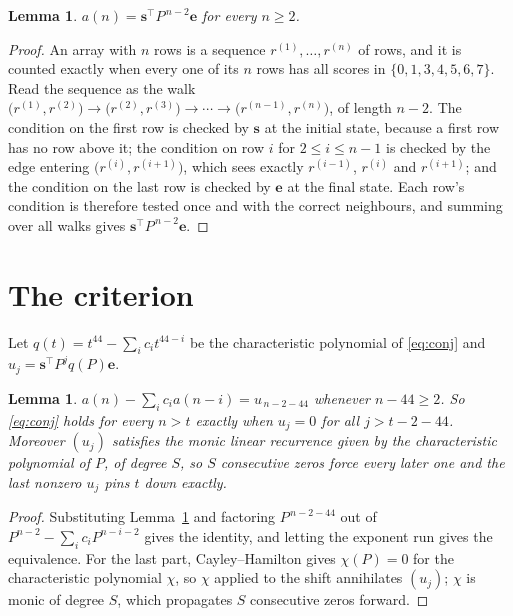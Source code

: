 \documentclass[11pt,a4paper]{article}
\theoremstyle{plain}
\newtheorem{lemma}[theorem]{Lemma}
\theoremstyle{definition}
\begin{document}
\begin{lemma}\label{lem:walk}
$a(n)=\mathbf{s}^{\!\top}P^{\,n-2}\mathbf{e}$ for every $n\ge2$.
\end{lemma}

\begin{proof}
An array with $n$ rows is a sequence $r^{(1)},\dots,r^{(n)}$ of rows, and it is counted
exactly when every one of its $n$ rows has all scores in $\{0,1,3,4,5,6,7\}$. Read the sequence as the
walk $\bigl(r^{(1)},r^{(2)}\bigr)\to\bigl(r^{(2)},r^{(3)}\bigr)\to\cdots\to
\bigl(r^{(n-1)},r^{(n)}\bigr)$, of length $n-2$. The condition on the first row is
checked by $\mathbf{s}$ at the initial state, because a first row has no row above it; the
condition on row $i$ for $2\le i\le n-1$ is checked by the edge entering
$\bigl(r^{(i)},r^{(i+1)}\bigr)$, which sees exactly $r^{(i-1)}$, $r^{(i)}$ and
$r^{(i+1)}$; and the condition on the last row is checked by $\mathbf{e}$ at the final
state. Each row's condition is therefore tested once and with the correct neighbours, and
summing over all walks gives $\mathbf{s}^{\!\top}P^{\,n-2}\mathbf{e}$.
\end{proof}

\section{The criterion}

Let $q(t)=t^{44}-\sum_i c_i t^{44-i}$ be the characteristic polynomial of
\eqref{eq:conj} and $u_j=\mathbf{s}^{\!\top}P^{j}q(P)\mathbf{e}$.

\begin{lemma}\label{lem:crit}
$a(n)-\sum_i c_i a(n-i)=u_{\,n-2-44}$ whenever $n-44\ge2$. So \eqref{eq:conj}
holds for every $n>t$ exactly when $u_j=0$ for all $j>t-2-44$. Moreover $(u_j)$
satisfies the monic linear recurrence given by the characteristic polynomial of $P$, of
degree $S$, so $S$ consecutive zeros force every later one and the last nonzero $u_j$ pins
$t$ down exactly.
\end{lemma}

\begin{proof}
Substituting Lemma~\ref{lem:walk} and factoring $P^{\,n-2-44}$ out of
$P^{n-2}-\sum_i c_i P^{n-i-2}$ gives the identity, and letting the exponent run gives the
equivalence. For the last part, Cayley--Hamilton gives $\chi(P)=0$ for the characteristic
polynomial $\chi$, so $\chi$ applied to the shift annihilates $(u_j)$; $\chi$ is monic of
degree $S$, which propagates $S$ consecutive zeros forward.
\end{proof}
\end{document}
